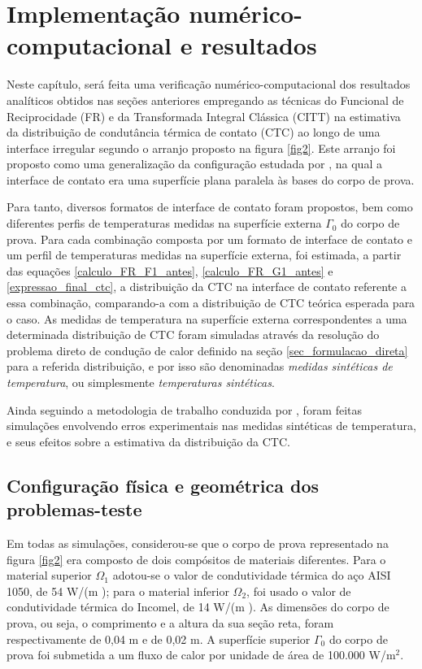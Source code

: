 \section{Implementação numérico-computacional e resultados}

Neste capítulo, será feita uma verificação numérico-computacional dos resultados analíticos obtidos nas seções anteriores empregando as técnicas do Funcional de Reciprocidade (FR) e da Transformada Integral Clássica (CITT) na estimativa da distribuição de condutância térmica de contato (CTC) ao longo de uma interface irregular segundo o arranjo proposto na figura \ref{fig2}. Este arranjo foi proposto como uma generalização da configuração estudada por \cite{tese_padilha}, na qual a interface de contato era uma superfície plana paralela às bases do corpo de prova.

Para tanto, diversos formatos de interface de contato foram propostos, bem como diferentes perfis de temperaturas medidas na superfície externa $\Gamma_0$ do corpo de prova. Para cada combinação composta por um formato de interface de contato e um perfil de temperaturas medidas na superfície externa, foi estimada, a partir das equações \eqref{calculo_FR_F1_antes}, \eqref{calculo_FR_G1_antes} e \eqref{expressao_final_ctc}, a distribuição da CTC na interface de contato referente a essa combinação, comparando-a com a distribuição de CTC teórica esperada para o caso. As medidas de temperatura na superfície externa correspondentes a uma determinada distribuição de CTC foram simuladas através da resolução do problema direto de condução de calor definido na seção \ref{sec_formulacao_direta} para a referida distribuição, e por isso são denominadas \textit{medidas sintéticas de temperatura}, ou simplesmente \textit{temperaturas sintéticas}.

Ainda seguindo a metodologia de trabalho conduzida por \cite{tese_padilha}, foram feitas simulações envolvendo erros experimentais nas medidas sintéticas de temperatura, e seus efeitos sobre a estimativa da distribuição da CTC.

\subsection{Configuração física e geométrica dos problemas-teste}\label{config_fis_geom}

Em todas as simulações, considerou-se que o corpo de prova representado na figura \ref{fig2} era composto de dois compósitos de materiais diferentes. Para o material superior $\Omega_1$ adotou-se o valor de condutividade térmica do aço AISI 1050, de 54 W/(m \celsius); para o material inferior $\Omega_2$, foi usado o valor de condutividade térmica do Incomel, de 14 W/(m \celsius). As dimensões do corpo de prova, ou seja, o comprimento e a altura da sua seção reta, foram respectivamente de 0,04 m e de 0,02 m. A superfície superior $\Gamma_0$ do corpo de prova foi submetida a um fluxo de calor por unidade de área de 100.000 W/$\text{m}^2$.

